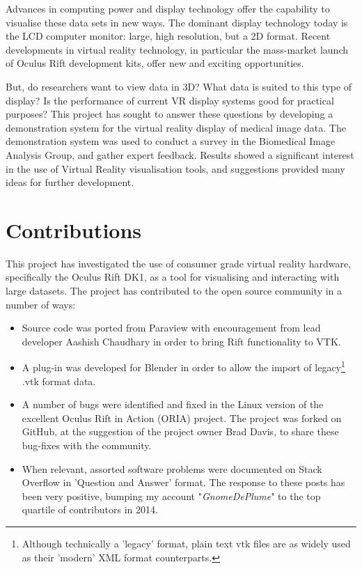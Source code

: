 \documentclass[MSc,paper=a4,pagesize=auto]{icldt}
\begin{document}
Advances in computing power and display technology offer the capability to visualise these data sets in new ways. The dominant display technology today is the LCD computer monitor: large, high resolution, but a 2D format. Recent developments in virtual reality technology, in particular the mass-market launch of Oculus Rift development kits, offer new and exciting opportunities.

But, do researchers want to view data in 3D? What data is suited to this type of display? Is the performance of current VR display systems good for practical purposes? This project has sought to answer these questions by developing a demonstration system for the virtual reality display of medical image data. The demonstration system was used to conduct a survey in the Biomedical Image Analysis Group, and gather expert feedback. Results showed a significant interest in the use of Virtual Reality visualisation tools, and suggestions provided many ideas for further development.

\newpage
\section{Contributions}
This project has investigated the use of consumer grade virtual reality hardware, specifically the Oculus Rift DK1, as a tool for visualising and interacting with large datasets. The project has contributed to the open source community in a number of ways:

\begin{itemize}
  \item Source code was ported from Paraview with encouragement from lead developer Aashish Chaudhary in order to bring Rift functionality to VTK.
  \item A plug-in was developed for Blender in order to allow the import of legacy\footnote{Although technically a 'legacy' format, plain text vtk files are as widely used as their 'modern' XML format counterparts.} .vtk format data.
  \item A number of bugs were identified and fixed in the Linux version of the excellent Oculus Rift in Action (ORIA) project. The project was forked on GitHub, at the suggestion of the project owner Brad Davis, to share these bug-fixes with the community.
  \item When relevant, assorted software problems were documented on Stack Overflow in 'Question and Answer' format. The response to these posts has been very positive, bumping my account "\textit{GnomeDePlume}" to the top quartile of contributors in 2014.  
\end{itemize}
\end{document}
